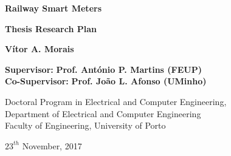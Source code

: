\vspace{25mm}
\begin{addmargin}[2cm]{1mm}
	\begin{center}
		
		\begin{LARGE}
			\textbf{\color{FEUP} Railway Smart Meters\\}
		\end{LARGE}
		
		\vspace{5mm}
		
		\textbf{Thesis Research Plan\\}
		
		\vspace{30mm}
		
		\textbf{\Large Vítor A. Morais} \\
		
		\vspace{5mm}
		
		\textbf{Supervisor:} \textbf{Prof. António P. Martins (FEUP)} \\
		\textbf{Co-Supervisor:} \textbf{Prof. João L. Afonso (UMinho)}
		
		\vfill %
		
		\small{Doctoral Program in Electrical and Computer Engineering,}\\
		\small{Department of Electrical and Computer Engineering}\\
		\small{Faculty of Engineering, University of Porto\\}
		\small{$23^{th}$ November, 2017 \par}%
		
	\end{center}
	
\end{addmargin}


\clearpage %

%
\cleardoublepage
{}
\tableofcontents
\cleardoublepage
{}
\listoffigures
\cleardoublepage
{}
\listoftables

